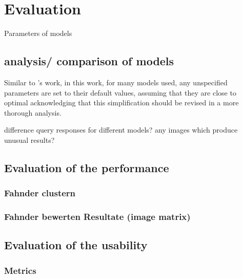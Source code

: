 \chapter{Evaluation}\label{ch:evaluation}
Parameters of models






















\section{analysis/ comparison of models}\label{sec:evaluation-models}

Similar to \citeauthor{glove2014}'s work, in this work, for many models used, any unspecified parameters are set to their default values, 
assuming that they are close to optimal
acknowledging that this simplification should be revised in a more thorough analysis.

difference query responses for different models?
any images which produce unusual results?

\section{Evaluation of the performance}\label{sec:evaluation-performance}

\subsection{Fahnder clustern}\label{subsec:evaluation-metric1}

\subsection{Fahnder bewerten Resultate (image matrix)}\label{subsec:evaluation-metric2}

\section{Evaluation of the usability}\label{sec:evaluation-usability}

\subsection{Metrics}\label{subsec:evaluation-metrics}